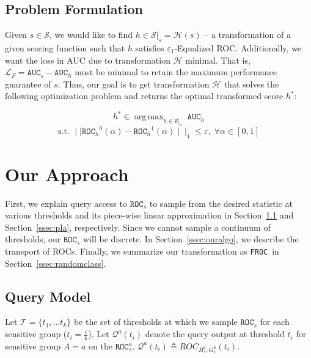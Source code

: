 \documentclass{article}
\DeclareMathOperator*{\argmax}{arg\,max}
\newcommand{\ouralgo}{\texttt{FROC}}
\newcommand{\ourdef}{-Equalized ROC}
\newcommand{\roc}{\texttt{ROC}_s}
\newcommand{\auc}{\texttt{AUC}_s}
\begin{document}
\subsection{Problem Formulation}

Given $s\in \mathcal{S}$, we would like to find $h\in\mathcal{S}|_s = \mathcal{H}(s)$ -- a transformation of a given scoring function such that $h$ satisfies $\varepsilon_1$\ourdef. Additionally, we want the loss in AUC due to transformation $\mathcal{H}$ minimal. That is, $\mathcal{L}_{F} = \auc - \texttt{AUC}_h$ must be minimal to retain the maximum performance guarantee of $s$. Thus, our goal is to get transformation $\mathcal{H}$ that solves the following optimization problem and returns the optimal transformed score $h^*$: 


\begin{equation} \label{eq:fpp}
    h^* \in \argmax_{h \in \mathcal{S}|_s} \; \texttt{AUC}_h 
\end{equation}
    \[\text{s.t. } \mid \mid {\texttt{ROC}_{h}}^0(\alpha) - {\texttt{ROC}_{h}}^1(\alpha)\mid \mid_1 \leq \varepsilon , \;
    \forall \alpha \in [0,1]
\]


\section{Our Approach}
\label{sec:froc}
First, we explain query access to $\roc$ to sample from the desired statistic at various thresholds and its piece-wise linear approximation in Section~\ref{ssec:query} and Section~\ref{ssec:pla}, respectively. Since we cannot sample a continuum of thresholds, our $\roc$ will be discrete. In Section~\ref{ssec:ouralgo}, we describe the transport of ROCs.
Finally, we summarize our transformation as \ouralgo\ in Section~\ref{ssec:randomclass}.


\subsection{Query Model} \label{ssec:query}
Let $\mathcal{T} = \{ t_1, \ldots t_k \}$ be the set of thresholds at which we sample $\roc$ for each sensitive group ($t_i=\frac{i}{k}$).
Let $\mathcal{Q}^a(t_i)$ denote the query output at threshold $t_i$ for sensitive group $A = a$ on the $\roc^a$.
$
    \mathcal{Q}^a(t_i) \triangleq ROC_{H_s^{a}, G_s^{a}}(t_i)
$.
\end{document}
